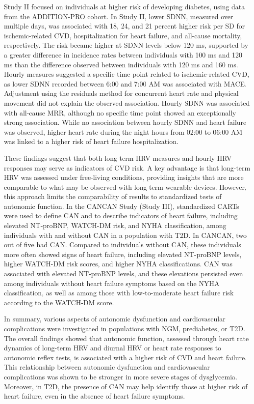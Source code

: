 \documentclass[
  a4paper,
  headsepline=true,
  open=left]{scrbook}
\begin{document}
Study II focused on individuals at higher risk of developing diabetes,
using data from the ADDITION-PRO cohort. In Study II, lower SDNN,
measured over multiple days, was associated with 18, 24, and 21 percent
higher risk per SD for ischemic-related CVD, hospitalization for heart
failure, and all-cause mortality, respectively. The risk became higher
at SDNN levels below 120 ms, supported by a greater difference in
incidence rates between individuals with 100 ms and 120 ms than the
difference observed between individuals with 120 ms and 160 ms. Hourly
measures suggested a specific time point related to ischemic-related
CVD, as lower SDNN recorded between 6:00 and 7:00 AM was associated with
MACE. Adjustment using the residuals method for concurrent heart rate
and physical movement did not explain the observed association. Hourly
SDNN was associated with all-cause MRR, although no specific time point
showed an exceptionally strong association. While no association between
hourly SDNN and heart failure was observed, higher heart rate during the
night hours from 02:00 to 06:00 AM was linked to a higher risk of heart
failure hospitalization.

These findings suggest that both long-term HRV measures and hourly HRV
responses may serve as indicators of CVD risk. A key advantage is that
long-term HRV was assessed under free-living conditions, providing
insights that are more comparable to what may be observed with long-term
wearable devices. However, this approach limits the comparability of
results to standardized tests of autonomic function. In the CANCAN Study
(Study III), standardized CARTs were used to define CAN and to describe
indicators of heart failure, including elevated NT-proBNP, WATCH-DM
risk, and NYHA classification, among individuals with and without CAN in
a population with T2D. In CANCAN, two out of five had CAN. Compared to
individuals without CAN, these individuals more often showed signs of
heart failure, including elevated NT-proBNP levels, higher WATCH-DM risk
scores, and higher NYHA classifications. CAN was associated with
elevated NT-proBNP levels, and these elevations persisted even among
individuals without heart failure symptoms based on the NYHA
classification, as well as among those with low-to-moderate heart
failure risk according to the WATCH-DM score.

In summary, various aspects of autonomic dysfunction and cardiovascular
complications were investigated in populations with NGM, prediabetes, or
T2D. The overall findings showed that autonomic function, assessed
through heart rate dynamics of long-term HRV and diurnal HRV or heart
rate responses to autonomic reflex tests, is associated with a higher
risk of CVD and heart failure. This relationship between autonomic
dysfunction and cardiovascular complications was shown to be stronger in
more severe stages of dysglycemia. Moreover, in T2D, the presence of CAN
may help identify those at higher risk of heart failure, even in the
absence of heart failure symptoms.
\end{document}
